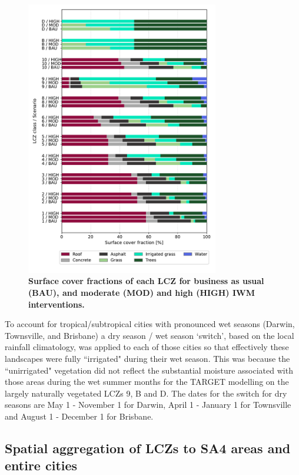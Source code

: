 \documentclass[utf8]{frontiersSCNS} %
\begin{document}
\begin{figure}
\centering
\includegraphics[width=0.75\textwidth]{images/image6.pdf}
\caption{\bf Surface cover fractions of each LCZ for business as usual (BAU), and moderate (MOD) and high (HIGH) IWM interventions.}
 \label{fig:surflcz}
\end{figure}

To account for tropical/subtropical cities with pronounced wet seasons (Darwin, Townsville, and Brisbane) a dry season / wet season `switch', based on the local rainfall climatology, was applied to each of those cities so that effectively these landscapes were fully ``irrigated" during their wet season. This was because the ``unirrigated" vegetation did not reflect the substantial moisture associated with those areas during the wet summer months for the TARGET modelling on the largely naturally vegetated LCZs 9, B and D. The dates for the switch for dry seasons are May 1 - November 1 for Darwin, April 1 - January 1 for Townsville and August 1 - December 1 for Brisbane. 

\subsection{Spatial aggregation of LCZs to SA4 areas and entire cities}
\end{document}

